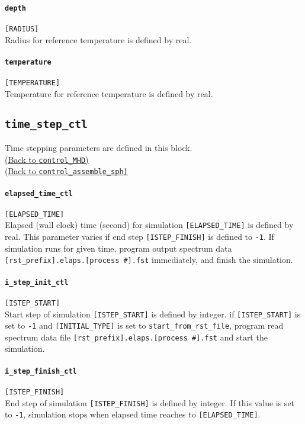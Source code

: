 \paragraph{\tt depth}
\label{href_t:depth}
\verb|[RADIUS]| \\
Radius for reference temperature is defined by real.

\paragraph{\tt temperature}
\label{href_t:temperature}
\verb|[TEMPERATURE]| \\
Temperature for reference temperature is defined by real.


\subsection{\tt time\_step\_ctl}
\label{href_t:time_step_ctl}
Time stepping parameters are defined in this block. \\
\hyperref[href_i:time_step_ctl]{(Back to {\tt control\_MHD})} \\
\hyperref[href_i:time_step_ctl2]{(Back to {\tt control\_assemble\_sph)}}

\paragraph{\tt elapsed\_time\_ctl}
\label{href_t:elapsed_time_ctl}
\verb|[ELAPSED_TIME]| \\
Elapsed (wall clock) time (second) for simulation \verb|[ELAPSED_TIME]| is defined by real. 
This parameter varies if end step \verb|[ISTEP_FINISH]| is defined to {\tt -1}. If simulation runs for given time, program output spectrum data  \verb|[rst_prefix].elaps.[process #].fst| immediately, and finish the simulation.

\paragraph{\tt i\_step\_init\_ctl}
\label{href_t:i_step_init_ctl}
\verb|[ISTEP_START]| \\
Start step of simulation \verb|[ISTEP_START]| is defined by integer. if \verb|[ISTEP_START]| is set to {\tt -1} and \verb|[INITIAL_TYPE]| is set to \verb|start_from_rst_file|, program read spectrum data file \verb|[rst_prefix].elaps.[process #].fst| and start the simulation.

\paragraph{\tt i\_step\_finish\_ctl}
\label{href_t:i_step_finish_ctl}
\verb|[ISTEP_FINISH]| \\
End step of simulation \verb|[ISTEP_FINISH]| is defined by integer. If this value is set to  {\tt -1}, simulation stops when elapsed time reaches to \verb|[ELAPSED_TIME]|.

